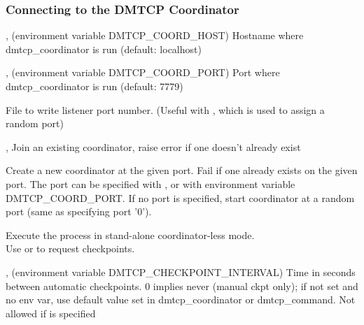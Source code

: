 \subsubsection{Connecting to the DMTCP Coordinator}
\begin{Description}
  \item[\Opt{-h}, \Opt{--coord-host} \Arg{hostname} (environment variable DMTCP_COORD_HOST)]
    Hostname where dmtcp_coordinator is run (default: localhost)

  \item[\Opt{-p}, \Opt{--coord-port} \Arg{port} (environment variable DMTCP_COORD_PORT)]
    Port where dmtcp_coordinator is run (default: 7779)

  \item[\OptSArg{--port-file}{filename}]
    File to write listener port number.
    (Useful with , which is used to assign a random port)

  \item[\Opt{-j}, \Opt{--join}]
    Join an existing coordinator, raise error if one doesn't
    already exist

  \item[\Opt{--new-coordinator}]
    Create a new coordinator at the given port. Fail if one
    already exists on the given port. The port can be specified
    with , or with environment variable DMTCP_COORD_PORT.
    If no port is specified, start coordinator at a random port (same
    as specifying port '0').

  \item[\Opt{--no-coordinator}]
    Execute the process in stand-alone coordinator-less mode.\\
    Use  or  to request checkpoints.

  \item[\Opt{-i}, \Opt{-interval} \Arg{seconds} (environment variable DMTCP_CHECKPOINT_INTERVAL)]
    Time in seconds between automatic checkpoints.
    0 implies never (manual ckpt only); if not set and no env var,
    use default value set in dmtcp_coordinator or dmtcp_command.
    Not allowed if  is specified
\end{Description}

